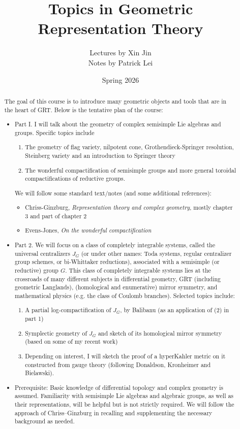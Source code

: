 \documentclass{amsart}
\title{Topics in Geometric Representation Theory}
\author{Lectures by Xin Jin \\ Notes by Patrick Lei}
\date{Spring 2026}
\theoremstyle{definition}
\theoremstyle{remark}
\theoremstyle{plain}
\theoremstyle{definition}
\theoremstyle{remark}
\newcommand{\1}{\mathbf{1}}
\newcommand{\2}{\mathbf{2}}
\newcommand{\3}{\mathbf{3}}
\begin{document}
    
\begin{abstract}
    The goal of this course is to introduce many geometric objects and tools that are in the heart of GRT. Below is the tentative plan of the course:
    \begin{itemize}
        \item Part I.  I will talk about the geometry of complex semisimple Lie algebras and groups.
        Specific topics include 
            \begin{enumerate}[(1)]
                \item The geometry of flag variety, nilpotent cone, Grothendieck-Springer resolution, Steinberg variety and an introduction to Springer theory
                \item The wonderful compactification of semisimple groups and more general toroidal compactifications of reductive groups.
            \end{enumerate}
        We will follow some standard text/notes (and some additional references):
        \begin{itemize}
            \item Chriss-Ginzburg, \textit{Representation theory and complex geometry}, mostly chapter 3 and part of chapter 2
            \item Evens-Jones, \textit{On the wonderful compactification}
        \end{itemize}
        \item Part 2. We will focus on a class of completely integrable systems, called the universal centralizers \(J_G\) (or under other names: Toda systems, regular centralizer group schemes, or bi-Whittaker reductions), associated with a semisimple (or reductive) group \(G\).
        This class of completely integrable systems lies at the crossroads of many different subjects in differential geometry, GRT (including geometric Langlands), (homological and enumerative) mirror symmetry, and mathematical physics (e.g. the class of Coulomb branches).
        Selected topics include:
        \begin{enumerate}[(1)]
            \item A partial log-compactification of \(J_G\), by Balibanu (as an application of (2) in part 1)
            \item Symplectic geometry of \(J_G\) and sketch of its homological mirror symmetry (based on some of my recent work)
            \item Depending on interest, I will sketch the proof of a hyperKahler metric on it constructed from gauge theory (following Donaldson, Kronheimer and Bielawski).
        \end{enumerate}
    \item Prerequisite: Basic knowledge of differential topology and complex geometry is assumed. Familiarity with semisimple Lie algebras and algebraic groups, as well as their representations, will be helpful but is not strictly required. We will follow the approach of Chriss–Ginzburg in recalling and supplementing the necessary background as needed.
    \end{itemize}
\end{abstract}
\end{document}
